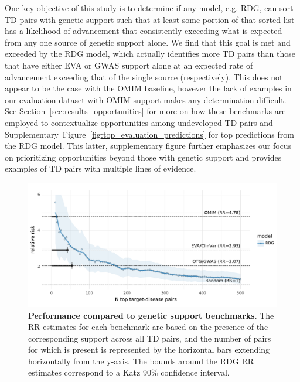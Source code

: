 \documentclass{article}
\begin{document}
One key objective of this study is to determine if any model, e.g. RDG, can sort TD pairs with genetic support such that at least some portion of that sorted list has a likelihood of advancement that consistently exceeding what is expected from any one source of genetic support alone. We find that this goal is met and exceeded by the RDG model, which actually identifies more TD pairs than those that have either EVA or GWAS support alone at an expected rate of advancement exceeding that of the single source (respectively). This does not appear to be the case with the OMIM baseline, however the lack of examples in our evaluation dataset with OMIM support makes any determination difficult. See Section~\ref{sec:results_opportunities} for more on how these benchmarks are employed to contextualize opportunities among undeveloped TD pairs and Supplementary~Figure~\ref{fig:top_evaluation_predictions} for top predictions from the RDG model. This latter, supplementary figure further emphasizes our focus on prioritizing opportunities beyond those with genetic support and provides examples of TD pairs with multiple lines of evidence.

\begin{figure}[!htb]
  \centering
  \captionsetup{width=.9\linewidth}
  \includegraphics[width=1\textwidth]{relative_risk_by_limit.pdf}
  \caption{
    \textbf{Performance compared to genetic support benchmarks}. The RR estimates for each benchmark are based on the presence of the corresponding support across all TD pairs, and the number of pairs for which is present is represented by the horizontal bars extending horizontally from the y-axis. The bounds around the RDG RR estimates correspond to a Katz 90\% confidence interval.
  }
  \label{fig:relative_risk_by_limit}
\end{figure}
\end{document}
